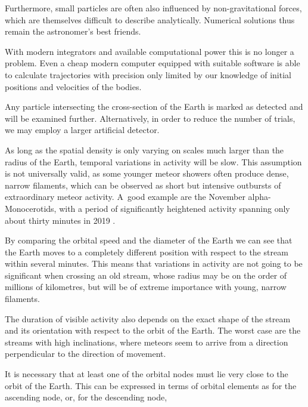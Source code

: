        Furthermore, small particles are often also influenced by non-gravitational forces,
        which are themselves difficult to describe analytically.
        Numerical solutions thus remain the astronomer's best friends.

        With modern integrators and available computational power this is no longer a problem.
        Even a cheap modern computer equipped with suitable software is able to calculate trajectories
        with precision only limited by our knowledge of initial positions and velocities of the bodies.


    Any particle intersecting the cross-section of the Earth is marked as detected and will be examined further.
    Alternatively, in order to reduce the number of trials, we may employ a larger artificial detector.


    As long as the spatial density is only varying on scales much larger than the radius of the Earth,
    temporal variations in activity will be slow.
    This assumption is not universally valid, as some younger meteor showers often produce dense, narrow filaments,
    which can be observed as short but intensive outbursts of extraordinary meteor activity.
    A~good example are the November alpha-Monocerotids, with a period of significantly
    heightened activity spanning only about thirty minutes in 2019 \citep{CBET4692}.

    By comparing the orbital speed and the diameter of the Earth we can see that the Earth moves
    to a completely different position with respect to the stream within several minutes.
    This means that variations in activity are not going to be significant when crossing an old stream,
    whose radius may be on the order of millions of kilometres, but will be of extreme importance with young, narrow filaments.

    The duration of visible activity also depends on the exact shape of the stream and its orientation with respect to the orbit of the Earth.
    The worst case are the streams with high inclinations, where meteors seem to arrive from a direction perpendicular
    to the direction of movement.



    It is necessary that at least one of the orbital nodes must lie very close to the orbit of the Earth.
    This can be expressed in terms of orbital elements as
    for the ascending node, or, for the descending node,


